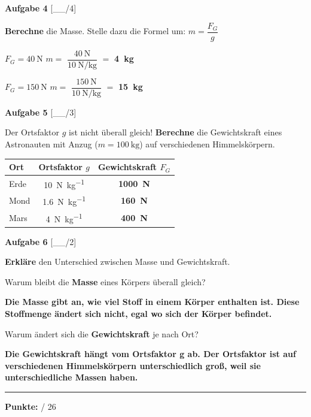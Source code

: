 \documentclass[11pt, a4paper]{article}
\newcommand{\maxpunkte}{26}
\newcommand{\lsg}[1]{\textcolor{loesung}{\textbf{#1}}}
\newif\ifzeigesternchen
\newcommand{\punktebox}[1]{\hfill\small\textcolor{mittelgrau}{[\_\_/#1]}}
\newcommand{\stern}[1]{%
    \ifzeigesternchen%
        \textsuperscript{\textcolor{fachfarbe}{(#1)}}%
    \fi%
}
\newcommand{\aufgabe}[2]{%
    \needspace{4\baselineskip}%
    \vspace{10pt}%
    \noindent\textbf{\textcolor{fachfarbe}{Aufgabe #1}} #2%
    \vspace{4pt}%
    \nopagebreak[4]%
}
\newcommand{\operator}[1]{\textbf{\textcolor{fachfarbe}{#1}}}
\begin{document}
\newpage

\aufgabe{4}{\stern{**}} \punktebox{4}

\operator{Berechne} die Masse. Stelle dazu die Formel um: $m = \dfrac{F_G}{g}$

\vspace{0.2em}
\begin{teil}
    \item $F_G = \SI{40}{\newton}$ \hfill $m = $ \lsg{$\dfrac{\SI{40}{\newton}}{\SI{10}{\newton\per\kilogram}}$} $= $ \lsg{\SI{4}{\kilogram}}
    \item $F_G = \SI{150}{\newton}$ \hfill $m = $ \lsg{$\dfrac{\SI{150}{\newton}}{\SI{10}{\newton\per\kilogram}}$} $= $ \lsg{\SI{15}{\kilogram}}
\end{teil}


\aufgabe{5}{\stern{***}} \punktebox{3}

Der Ortsfaktor $g$ ist nicht überall gleich! \operator{Berechne} die Gewichtskraft eines Astronauten mit Anzug ($m = \SI{100}{\kilogram}$) auf verschiedenen Himmelskörpern.

\vspace{0.3em}
\begin{center}
\begin{tabular}{|l|c|c|}
\hline
\textbf{Ort} & \textbf{Ortsfaktor $g$} & \textbf{Gewichtskraft $F_G$} \\
\hline
Erde & \SI{10}{\newton\per\kilogram} & \lsg{\SI{1000}{\newton}} \\
\hline
Mond & \SI{1,6}{\newton\per\kilogram} & \lsg{\SI{160}{\newton}} \\
\hline
Mars & \SI{4}{\newton\per\kilogram} & \lsg{\SI{400}{\newton}} \\
\hline
\end{tabular}
\end{center}


\aufgabe{6}{\stern{***}} \punktebox{2}

\operator{Erkläre} den Unterschied zwischen Masse und Gewichtskraft.

\vspace{0.2em}
\begin{teil}
    \item Warum bleibt die \textbf{Masse} eines Körpers überall gleich?

    \lsg{Die Masse gibt an, wie viel Stoff in einem Körper enthalten ist. Diese Stoffmenge ändert sich nicht, egal wo sich der Körper befindet.}

    \item Warum ändert sich die \textbf{Gewichtskraft} je nach Ort?

    \lsg{Die Gewichtskraft hängt vom Ortsfaktor g ab. Der Ortsfaktor ist auf verschiedenen Himmelskörpern unterschiedlich groß, weil sie unterschiedliche Massen haben.}
\end{teil}


\vfill
\hrule
\vspace{0.4em}

\hfill\textbf{Punkte:} \underline{\hspace{1.2cm}} / \maxpunkte
\end{document}
